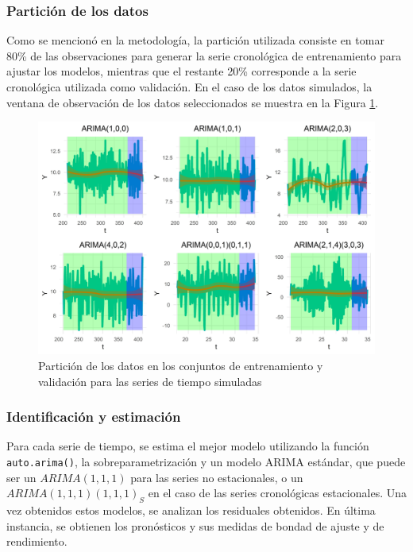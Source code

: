 \documentclass[
]{article}
\begin{document}
\subsubsection{Partición de los datos}

Como se mencionó en la metodología, la partición utilizada consiste en
tomar 80\% de las observaciones para generar la serie cronológica de
entrenamiento para ajustar los modelos, mientras que el restante 20\%
corresponde a la serie cronológica utilizada como validación. En el caso
de los datos simulados, la ventana de observación de los datos
seleccionados se muestra en la Figura
\ref{fig:particion_series_simuladas}.

\begin{figure}[H]
\includegraphics[width=1\linewidth,height=1\textheight]{Tesis_files/figure-latex/particion_series_simuladas-1} \caption{Partición de los datos en los conjuntos de entrenamiento y validación para las series de tiempo simuladas}\label{fig:particion_series_simuladas}
\end{figure}

\subsubsection{Identificación y estimación}

Para cada serie de tiempo, se estima el mejor modelo utilizando la
función \texttt{auto.arima()}, la sobreparametrización y un modelo ARIMA
estándar, que puede ser un \(ARIMA(1,1,1)\) para las series no
estacionales, o un \(ARIMA(1,1,1)(1,1,1)_S\) en el caso de las series
cronológicas estacionales. Una vez obtenidos estos modelos, se analizan
los residuales obtenidos. En última instancia, se obtienen los
pronósticos y sus medidas de bondad de ajuste y de rendimiento.
\end{document}
